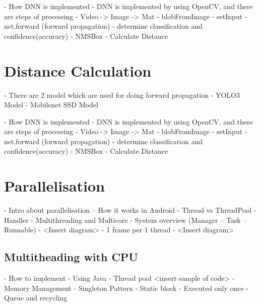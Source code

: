         -	How DNN is implemented
            - DNN is implemented by using OpenCV, and there are steps of processing
                - Video -> Image -> Mat
                - blobFromImage
                - setInput
                - net.forward (forward propagation)
                - determine classification and confidence(accuracy)
                - NMSBox
                - Calculate Distance

        \section{Distance Calculation}
            -	There are 2 model which are used for doing forward propagation
                - YOLO3 Model
                - Mobilenet SSD Model

            -	How DNN is implemented
                - DNN is implemented by using OpenCV, and there are steps of processing
                    - Video -> Image -> Mat
                    - blobFromImage
                    - setInput
                    - net.forward (forward propagation)
                    - determine classification and confidence(accuracy)
                    - NMSBox
                    - Calculate Distance

    \section{Parallelisation}
        -	Intro about parallelisation – How it works in Android
            - Thread vs ThreadPool
            - Handler
        -	Multithreading and Multicore
        -	System overview (Manager – Task – Runnable)
            - <Insert diagram>
        -	1 frame per 1 thread
            - <Insert diagram>

        \subsection{Multitheading with CPU}
            -	How to implement
                - Using Java
                - Thread pool
                    <insert sample of code>
            -	Memory Management
                - Singleton Pattern
                - Static block
                    - Executed only once
                - Queue and recycling

